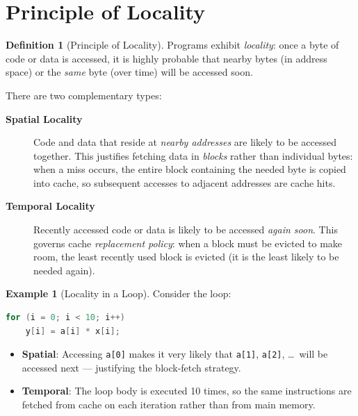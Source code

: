 \documentclass[11pt, a4paper, notitlepage]{report}
\theoremstyle{definition}
\newtheorem{definition}[theorem]{Definition}
\theoremstyle{remark}
\theoremstyle{definition}
\newtheorem{example}[theorem]{Example}
\begin{document}
\section{Principle of Locality}
\label{sec:locality}

\begin{definition}[Principle of Locality]
  \label{def:locality}
  Programs exhibit \emph{locality}: once a byte of code or data is accessed, it is highly probable that nearby bytes (in address space) or the \emph{same} byte (over time) will be accessed soon.
\end{definition}

There are two complementary types:

\begin{description}
  \item[\textbf{Spatial Locality}] Code and data that reside at \emph{nearby addresses} are likely to be accessed together. This justifies fetching data in \emph{blocks} rather than individual bytes: when a miss occurs, the entire block containing the needed byte is copied into cache, so subsequent accesses to adjacent addresses are cache hits.

  \item[\textbf{Temporal Locality}] Recently accessed code or data is likely to be accessed \emph{again soon}. This governs cache \emph{replacement policy}: when a block must be evicted to make room, the least recently used block is evicted (it is the least likely to be needed again).
\end{description}

\begin{example}[Locality in a Loop]
  \label{ex:locality-loop}
  Consider the loop:
  \begin{lstlisting}[language=C]
for (i = 0; i < 10; i++)
    y[i] = a[i] * x[i];
  \end{lstlisting}
  \begin{itemize}
    \item \textbf{Spatial}: Accessing \texttt{a[0]} makes it very likely that \texttt{a[1]}, \texttt{a[2]}, \ldots\ will be accessed next — justifying the block-fetch strategy.
    \item \textbf{Temporal}: The loop body is executed 10 times, so the same instructions are fetched from cache on each iteration rather than from main memory.
  \end{itemize}
\end{example}
\end{document}
